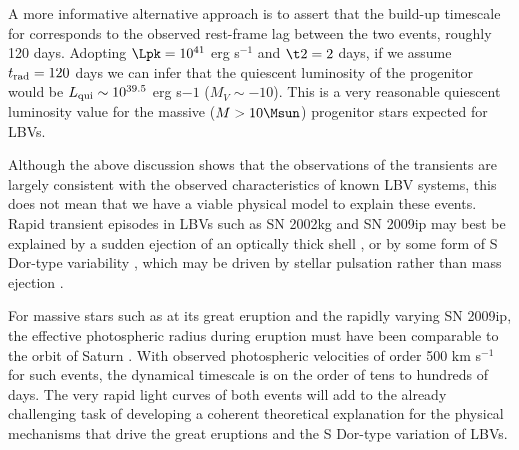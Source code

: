 A more informative alternative approach is to assert that the build-up
timescale for \spock corresponds to the observed rest-frame lag
between the two events, roughly 120 days. Adopting $\Lpk=10^{41}$ erg
s$^{-1}$ and $\t2=2$ days, if we assume $t_{\rm rad}=120$ days we can
infer that the quiescent luminosity of the \spock progenitor would be
$L_{\rm qui}\sim10^{39.5}$ erg s${-1}$ ($M_V\sim-10$).  This is a very
reasonable quiescent luminosity value for the massive ($M>10\Msun$)
progenitor stars expected for LBVs.

Although the above discussion shows that the observations of the
\spock transients are largely consistent with the observed
characteristics of known LBV systems, this does not mean that we have
a viable physical model to explain these events. Rapid transient
episodes in LBVs such as SN 2002kg and SN 2009ip may best be explained
by a sudden ejection of an optically thick shell
\citep[e.g.]{Smith:2010,Smith:2011b}, or by some form of S Dor-type
variability \citep{Weis:2005,VanDyk:2006,Foley:2011}, which may be
driven by stellar pulsation rather than mass ejection
\citep{VanGenderen:1997,VanGenderen:2001}.

For massive stars such as \etacar at its great eruption and the
rapidly varying SN 2009ip, the effective photospheric radius during
eruption must have been comparable to the orbit of Saturn
\citep[$10^{14}$ cm][]{Davidson:1997,Smith:2011,Foley:2011}.  With
observed photospheric velocities of order 500 km s$^{-1}$ for such
events, the dynamical timescale is on the order of tens to hundreds of
days.  The very rapid light curves of both \spock events will add to
the already challenging task of developing a coherent theoretical
explanation for the physical mechanisms that drive the great eruptions
and the S Dor-type variation of LBVs.

